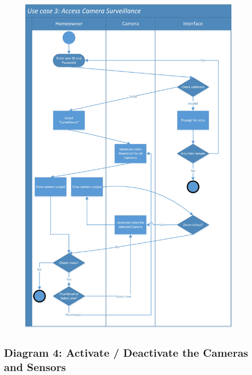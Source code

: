 \documentclass[twoside,11pt]{article}
\begin{document}
\begin{figure}[H]
    \centering
    \includegraphics[width=0.85\columnwidth]{SwimLaneDiagram/Usecase_3.jpg}
\end{figure}
\newpage

\subsection{Diagram 4: Activate / Deactivate the Cameras and Sensors}
\end{document}
